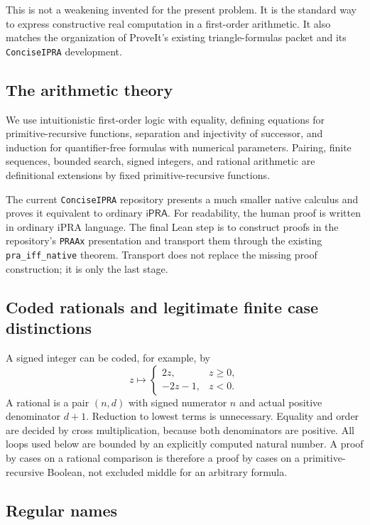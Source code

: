 \documentclass[11pt,letterpaper]{article}
\theoremstyle{definition}
\theoremstyle{remark}
\newcommand{\ipra}{\mathsf{iPRA}}
\begin{document}
This is not a weakening invented for the present problem.  It is the standard
way to express constructive real computation in a first-order arithmetic.  It
also matches the organization of ProveIt's existing triangle-formulas packet
and its \texttt{ConciseIPRA} development.

\subsection{The arithmetic theory}

We use intuitionistic first-order logic with equality, defining equations for
primitive-recursive functions, separation and injectivity of successor, and
induction for quantifier-free formulas with numerical parameters.  Pairing,
finite sequences, bounded search, signed integers, and rational arithmetic are
definitional extensions by fixed primitive-recursive functions.

The current \texttt{ConciseIPRA} repository presents a much smaller native
calculus and proves it equivalent to ordinary \(\ipra\).  For readability, the
human proof is written in ordinary iPRA language.  The final Lean step is to
construct proofs in the repository's \texttt{PRAAx} presentation and transport
them through the existing \texttt{pra\_iff\_native} theorem.  Transport does
not replace the missing proof construction; it is only the last stage.

\subsection{Coded rationals and legitimate finite case distinctions}

A signed integer can be coded, for example, by
\[
  z\longmapsto
  \begin{cases}
    2z,&z\ge0,\\
    -2z-1,&z<0.
  \end{cases}
\]
A rational is a pair \((n,d)\) with signed numerator \(n\) and actual positive
denominator \(d+1\).  Reduction to lowest terms is unnecessary.  Equality and
order are decided by cross multiplication, because both denominators are
positive.  All loops used below are bounded by an explicitly computed natural
number.  A proof by cases on a rational comparison is therefore a proof by
cases on a primitive-recursive Boolean, not excluded middle for an arbitrary
formula.

\subsection{Regular names}
\end{document}
